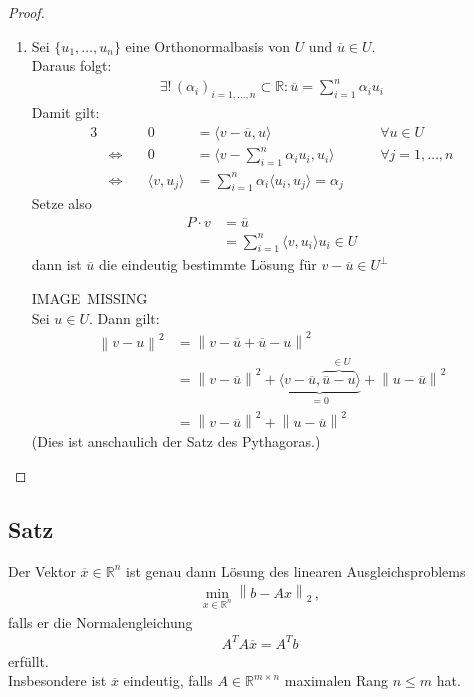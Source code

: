 \documentclass[ngerman,fontsize=11pt, paper=a4, parskip=half, titlepage=true, toc=bib]{scrbook}
\newcommand{\R}{\mathds{R}}
\newcommand{\Ren}{\mathds{R}^{n}}
\newcommand{\nn}[1]{\left\| #1 \right\|}
\newcommand{\scp}[2]{\langle #1, #2 \rangle}
\begin{document}
	\begin{proof}
	\begin{enumerate}[1)]
		\item Sei $\{u_1, \dots , u_n \}$ eine Orthonormalbasis von $U$ 
		und $\overline{u}\in U $. \\
		Daraus folgt:
		\begin{gather*}
			\exists ! \, (\alpha_i)_{i=1,\dotsc,n} \subset \R: \overline{u} = \sum_{i=1}^{n} \alpha_i u_i
		\end{gather*}
		Damit gilt:
		\begin{alignat*}{3}
			&&0 &= \scp{v-\overline{u}}{u} &\quad& \forall u \in U \\
			&\Longleftrightarrow \quad& 0 &= \scp{v- \sum_{i=1}^{n} \alpha_i u_i}{u_i} &\quad &\forall j=1, \dots , n\\
			&\Longleftrightarrow  & \scp{v}{u_j} &= \sum_{i=1}^{n} \alpha_i \scp{u_i}{u_j} = \alpha_j
		\end{alignat*}
		Setze also 
		\begin{align}
		\nonumber
			P\cdot v &= \overline{u} \\
						& = \sum_{i=1}^{n} \scp{v}{u_i} u_i \in U
						\label{IV.3.4}
		\end{align}
		dann ist $\overline{u}$ die eindeutig bestimmte Lösung für $ v-\overline{u} \in U^\bot$
		
	 IMAGE~MISSING \\
		
			Sei  $u\in U$. Dann gilt:
			\begin{align}
			\nonumber
				\nn{v-u}^2 &= \nn{v-\overline{u}+\overline{u} -u}^2 \\ \nonumber
								   &= \nn{v-\overline{u}}^2 +
								          \underbrace{\scp{v-\overline{u}}{\overbrace{\overline{u}-u}^{~~\in U}}}_{=0}
								          + \nn{u-\overline{u}}^2 \\
								   &= \nn{v-\overline{u}}^2 + \nn{u-\overline{u}}^2
								   \label{IV.3.5}
			\end{align}
			(Dies ist anschaulich der Satz des Pythagoras.)
	\end{enumerate}
	\end{proof}
	
	\subsection{Satz} 
	Der Vektor $\overline{x} \in\R^n$ ist genau dann Lösung des linearen Ausgleichsproblems
	\begin{gather*}
		\min_{x\in\Ren} \nn{b-Ax}_2 \, ,
	\end{gather*}
	falls er die Normalengleichung
	\begin{gather}
		A^TA\overline{x} = A^Tb
		\label{IV.3.6}
	\end{gather}
	erfüllt. \\
	Insbesondere ist $\overline{x}$ eindeutig,
	falls $A\in \R^{m\times n}$ maximalen Rang $n\leq m$ hat.
	
\end{document}
